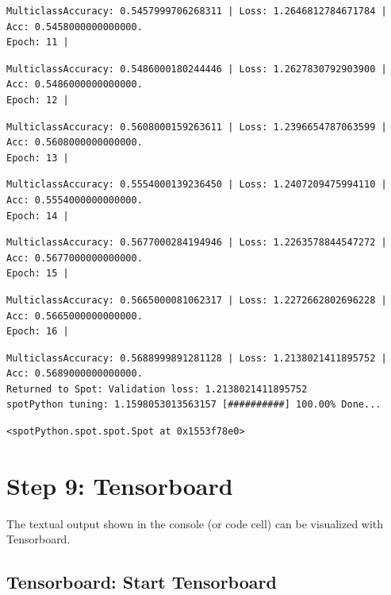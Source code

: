 \documentclass[
  letterpaper,
  DIV=11,
  numbers=noendperiod]{scrreprt}
\begin{document}
\begin{verbatim}
MulticlassAccuracy: 0.5457999706268311 | Loss: 1.2646812784671784 | Acc: 0.5458000000000000.
Epoch: 11 | 
\end{verbatim}

\begin{verbatim}
MulticlassAccuracy: 0.5486000180244446 | Loss: 1.2627830792903900 | Acc: 0.5486000000000000.
Epoch: 12 | 
\end{verbatim}

\begin{verbatim}
MulticlassAccuracy: 0.5608000159263611 | Loss: 1.2396654787063599 | Acc: 0.5608000000000000.
Epoch: 13 | 
\end{verbatim}

\begin{verbatim}
MulticlassAccuracy: 0.5554000139236450 | Loss: 1.2407209475994110 | Acc: 0.5554000000000000.
Epoch: 14 | 
\end{verbatim}

\begin{verbatim}
MulticlassAccuracy: 0.5677000284194946 | Loss: 1.2263578844547272 | Acc: 0.5677000000000000.
Epoch: 15 | 
\end{verbatim}

\begin{verbatim}
MulticlassAccuracy: 0.5665000081062317 | Loss: 1.2272662802696228 | Acc: 0.5665000000000000.
Epoch: 16 | 
\end{verbatim}

\begin{verbatim}
MulticlassAccuracy: 0.5688999891281128 | Loss: 1.2138021411895752 | Acc: 0.5689000000000000.
Returned to Spot: Validation loss: 1.2138021411895752
spotPython tuning: 1.1598053013563157 [##########] 100.00% Done...
\end{verbatim}

\begin{verbatim}
<spotPython.spot.spot.Spot at 0x1553f78e0>
\end{verbatim}

\hypertarget{sec-tensorboard-14}{%
\section{Step 9: Tensorboard}\label{sec-tensorboard-14}}

The textual output shown in the console (or code cell) can be visualized
with Tensorboard.

\hypertarget{tensorboard-start-tensorboard}{%
\subsection{Tensorboard: Start
Tensorboard}\label{tensorboard-start-tensorboard}}
\end{document}
